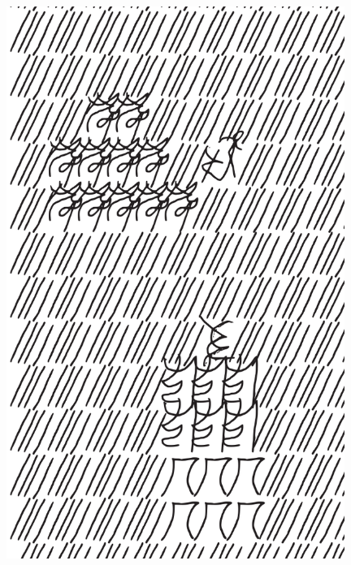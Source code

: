 \makeatletter\@openrightfalse
\movetooddpage
\begin{absolutelynopagebreak}
\begin{vplace}
\begin{figure}[H]
\begin{adjustwidth}{-0.99cm}{}
  \centering
  \vspace*{-1.77cm}
  \includegraphics[width=110mm]{./imgs/img11.pdf}  
  \hfill
\end{adjustwidth}

\thispagestyle{empty}

\end{figure}
\end{vplace}

\end{absolutelynopagebreak}

